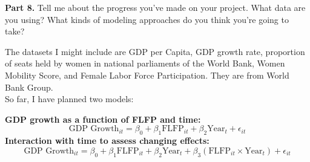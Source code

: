 \documentclass{article}
\begin{document}
\textbf{Part 8. }Tell me about the progress you’ve made on your project. What data are you using? What kinds of modeling approaches do you think you’re going to take?

The datasets I might include are GDP per Capita, GDP growth rate, proportion of seats held by women in national parliaments of the World Bank, Women Mobility Score, and Female Labor Force Participation. They are from World Bank Group.\\
So far, I have planned two models:
\vspace{0.5em}

\textbf{GDP growth as a function of FLFP and time:}  
\[
\text{GDP Growth}_{it} = \beta_0 + \beta_1 \text{FLFP}_{it} + \beta_2 \text{Year}_t + \epsilon_{it}
\]
\vspace{0.5em}
\textbf{Interaction with time to assess changing effects:}  
\[
\text{GDP Growth}_{it} = \beta_0 + \beta_1 \text{FLFP}_{it} + \beta_2 \text{Year}_t + \beta_3 (\text{FLFP}_{it} \times \text{Year}_t) + \epsilon_{it}
\]
\end{document}
